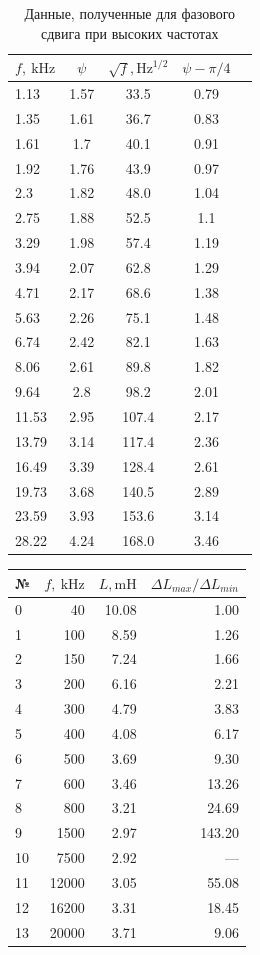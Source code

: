 \documentclass[12pt, a4paper]{article}
\newcommand{\kHz}{~\mathrm{kHz}}
\begin{document}
\begin{table}[H]
  \begin{tabular}{|l|c|c|c|c|}
    \hline
    $f, \kHz$ & $\psi$ & $\sqrt f, \mathrm{Hz}^{1/2}$ & $\psi - \pi/4$  \\
    \hline
    1.13 & 1.57 & 33.5 & 0.79   \\
    1.35 & 1.61 & 36.7 & 0.83  \\
    1.61 & 1.7 & 40.1 & 0.91  \\
    1.92 & 1.76 & 43.9 & 0.97  \\
    2.3 & 1.82 & 48.0 & 1.04  \\
    2.75 & 1.88 & 52.5 & 1.1  \\
    3.29 & 1.98 & 57.4 & 1.19  \\
    3.94 & 2.07 & 62.8 & 1.29  \\
    4.71 & 2.17 & 68.6 & 1.38  \\
    5.63 & 2.26 & 75.1 & 1.48  \\
    6.74 & 2.42 & 82.1 & 1.63  \\
    8.06 & 2.61 & 89.8 & 1.82  \\
    9.64 & 2.8 & 98.2 & 2.01  \\
    11.53 & 2.95 & 107.4 & 2.17  \\
    13.79 & 3.14 & 117.4 & 2.36  \\
    16.49 & 3.39 & 128.4 & 2.61  \\
    19.73 & 3.68 & 140.5 & 2.89  \\
    23.59 & 3.93 & 153.6 & 3.14  \\
    28.22 & 4.24 & 168.0 & 3.46  \\
    \hline
  \end{tabular}
  \caption{Данные, полученные для фазового сдвига при высоких частотах}
\end{table}

\begin{table}[H]
  \begin{tabular}{|l|r|r|r|}
    \hline
    № & $f, \kHz$ & $L, \mathrm{mH}$ & $\Delta L_{max}/\Delta L_{min}$ \\
    \hline
    0 & 40 & 10.08 & 1.00 \\
    1 & 100 & 8.59 & 1.26 \\
    2 & 150 & 7.24 & 1.66 \\
    3 & 200 & 6.16 & 2.21 \\
    4 & 300 & 4.79 & 3.83 \\
    5 & 400 & 4.08& 6.17 \\
    6 & 500 & 3.69 & 9.30 \\
    7 & 600 & 3.46 & 13.26 \\
    8 & 800 & 3.21 & 24.69 \\
    9 & 1500 & 2.97 & 143.20 \\
    10 & 7500 & 2.92 & --- \\
    11 & 12000 & 3.05 & 55.08 \\
    12 & 16200 & 3.31 & 18.45 \\
    13 & 20000 & 3.71 & 9.06 \\
    \hline
    \end{tabular}
\end{table}
\end{document}
